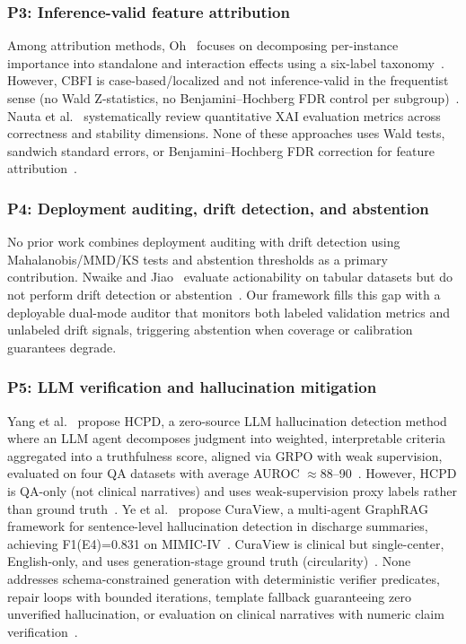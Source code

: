 \documentclass[11pt,a4paper]{article}
\theoremstyle{plain}
\begin{document}
\subsubsection{P3: Inference-valid feature attribution}

Among attribution methods, Oh~\cite{oh2026cbfi} focuses on decomposing per-instance importance into standalone and interaction effects using a six-label taxonomy~\cite{oh2026cbfi}. However, CBFI is case-based/localized and not inference-valid in the frequentist sense (no Wald Z-statistics, no Benjamini--Hochberg FDR control per subgroup)~\cite{oh2026cbfi}. Nauta et al.~\cite{nauta2023systematic} systematically review quantitative XAI evaluation metrics across correctness and stability dimensions. None of these approaches uses Wald tests, sandwich standard errors, or Benjamini--Hochberg FDR correction for feature attribution~\cite{datta2025conformal, liu2026speedcp, oh2026cbfi, kelechi2023mga, nauta2023systematic}.

\subsubsection{P4: Deployment auditing, drift detection, and abstention}

No prior work combines deployment auditing with drift detection using Mahalanobis/MMD/KS tests and abstention thresholds as a primary contribution. Nwaike and Jiao~\cite{kelechi2023mga} evaluate actionability on tabular datasets but do not perform drift detection or abstention~\cite{kelechi2023mga}. Our framework fills this gap with a deployable dual-mode auditor that monitors both labeled validation metrics and unlabeled drift signals, triggering abstention when coverage or calibration guarantees degrade.

\subsubsection{P5: LLM verification and hallucination mitigation}

Yang et al.~\cite{yang2026hcpd} propose HCPD, a zero-source LLM hallucination detection method where an LLM agent decomposes judgment into weighted, interpretable criteria aggregated into a truthfulness score, aligned via GRPO with weak supervision, evaluated on four QA datasets with average AUROC $\approx$88--90~\cite{yang2026hcpd}. However, HCPD is QA-only (not clinical narratives) and uses weak-supervision proxy labels rather than ground truth~\cite{yang2026hcpd}. Ye et al.~\cite{ye2026curaview} propose CuraView, a multi-agent GraphRAG framework for sentence-level hallucination detection in discharge summaries, achieving F1(E4){=}0.831 on MIMIC-IV~\cite{ye2026curaview}. CuraView is clinical but single-center, English-only, and uses generation-stage ground truth (circularity)~\cite{ye2026curaview}. None addresses schema-constrained generation with deterministic verifier predicates, repair loops with bounded iterations, template fallback guaranteeing zero unverified hallucination, or evaluation on clinical narratives with numeric claim verification~\cite{yang2026hcpd, ye2026curaview}.
\end{document}
